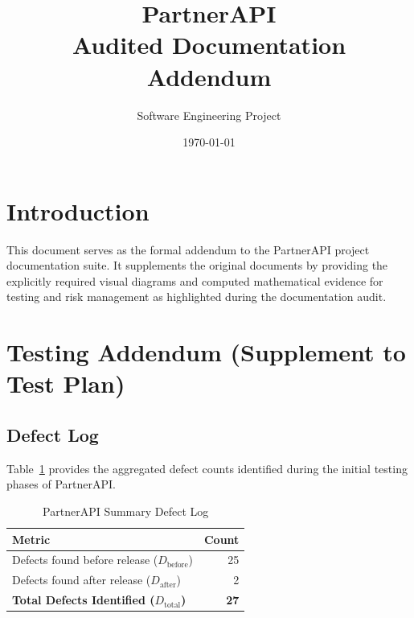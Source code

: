 \documentclass[12pt,a4paper]{article}
\title{
    \textbf{PartnerAPI}\\[6pt]
    \large Audited Documentation Addendum
}
\author{Software Engineering Project}
\date{\today}
\begin{document}
\maketitle

\tableofcontents

\newpage

\section{Introduction}

This document serves as the formal addendum to the PartnerAPI project
documentation suite. It supplements the original documents by
providing the explicitly required visual diagrams and computed
mathematical evidence for testing and risk management as highlighted
during the documentation audit.

\section{Testing Addendum (Supplement to Test Plan)}

\subsection{Defect Log}

Table~\ref{tab:defect-log} provides the aggregated defect counts
identified during the initial testing phases of PartnerAPI.

\begin{table}[htbp]
    \centering

    \begin{tabular}{lr}
        \toprule
        \textbf{Metric} & \textbf{Count} \\
        \midrule

        Defects found before release ($D_{\text{before}}$)
        & 25 \\

        Defects found after release ($D_{\text{after}}$)
        & 2 \\

        \midrule

        \textbf{Total Defects Identified ($D_{\text{total}}$)}
        & \textbf{27} \\

        \bottomrule
    \end{tabular}

    \caption{PartnerAPI Summary Defect Log}
    \label{tab:defect-log}
\end{table}
\end{document}

